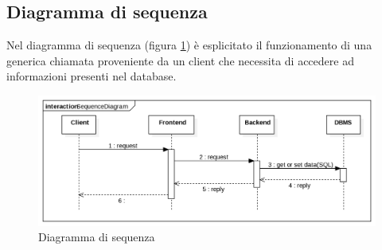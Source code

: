 \documentclass[11pt]{report}
\begin{document}
\subsection{Diagramma di sequenza}
Nel diagramma di sequenza (figura \ref{sequence_diagram}) è esplicitato il funzionamento di una generica chiamata proveniente da un client che necessita di accedere ad informazioni presenti nel database.
\begin{figure}
	\centering
	\includegraphics[scale=0.45]{SequenceDiagram}
	\caption{Diagramma di sequenza \label{sequence_diagram}}
\end{figure}
\end{document}

